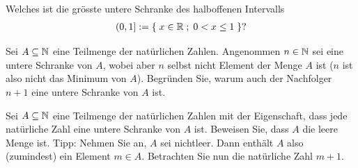 \begin{myexercise}\label{myexercise:0298}
	Welches ist die grösste untere Schranke des halboffenen Intervalls
	\begin{align*}
		\left(0, 1\right] := \left\{\;x\in\mathbb{R} \; ; \; 0<x\leq 1 \;\right\}?
	\end{align*}
\end{myexercise}

\begin{myexercise}\label{myexercise:0297}
	\begin{aenum}
		\item Sei $A\subseteq\mathbb{N}$ eine Teilmenge der natürlichen Zahlen.
		Angenommen $n\in\mathbb{N}$ sei eine untere Schranke von $A$, wobei aber $n$ selbst nicht Element der Menge $A$ ist ($n$ ist also nicht das Minimum von $A$). Begründen Sie, warum auch der Nachfolger $n+1$ eine untere Schranke von $A$ ist.
		\item Sei $A\subseteq\mathbb{N}$ eine Teilmenge der natürlichen Zahlen mit der Eigenschaft, dass jede natürliche Zahl eine untere Schranke von $A$ ist. Beweisen Sie, dass $A$ die leere Menge ist. Tipp: Nehmen Sie an, $A$ sei nichtleer. Dann enthält $A$ also (zumindest) ein Element $m\in A$. Betrachten Sie nun die natürliche Zahl $m+1$.
	\end{aenum}
\end{myexercise}

